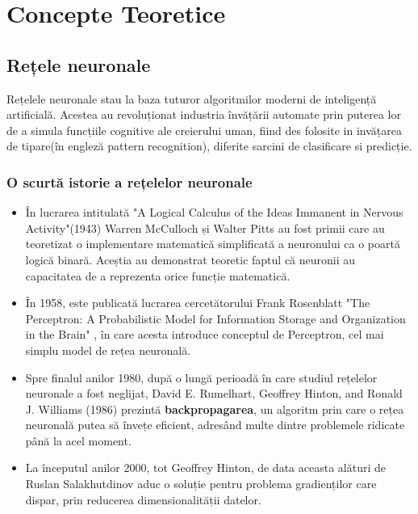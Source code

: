 \chapter{Concepte Teoretice}

\section{Rețele neuronale}

Rețelele neuronale stau la baza tuturor algoritmilor moderni de inteligență artificială. Acestea au revoluționat industria învățării automate prin puterea lor de a simula funcțiile cognitive ale creierului uman, fiind des folosite in invățarea de tipare(în engleză pattern recognition), diferite sarcini de clasificare si predicție. 

\subsection{O scurtă istorie a rețelelor neuronale}

\begin{itemize}
    \item În lucrarea intitulată "A Logical Calculus of the Ideas Immanent in Nervous Activity"(1943) \cite{mcculloch1943logical} Warren McCulloch și Walter Pitts au fost primii care au teoretizat o implementare matematică simplificată a neuronului ca o poartă logică binară. Aceștia au demonstrat teoretic faptul că neuronii au capacitatea de a reprezenta orice funcție matematică.

    \item În 1958, este publicată lucrarea cercetătorului Frank Rosenblatt "The Perceptron: A Probabilistic Model for Information Storage and Organization in the Brain" \cite{rosenblatt1958perceptron}, în care acesta introduce conceptul de Perceptron, cel mai simplu model de rețea neuronală. 

    \newpage
    
    \item Spre finalul anilor 1980, după o lungă perioadă în care studiul rețelelor neuronale a fost neglijat, David E. Rumelhart, Geoffrey Hinton, and Ronald J. Williams (1986) \cite{rumelhart1986learning} prezintă \textbf{backpropagarea}, un algoritm prin care o rețea neuronală putea să învețe eficient, adresând multe dintre problemele ridicate până la acel moment. 

    \item La începutul anilor 2000, tot Geoffrey Hinton, de data aceasta alături de Ruslan Salakhutdinov \cite{hinton2006reducing} aduc o soluție pentru problema gradienților care dispar, prin reducerea dimensionalității datelor.
\end{itemize}


